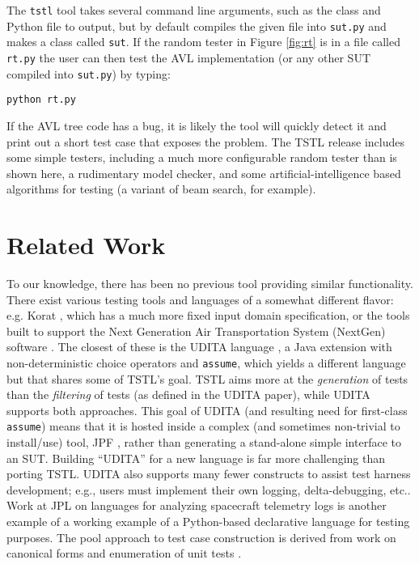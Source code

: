 \documentclass{sig-alternate}
\begin{document}
The {\tt tstl} tool takes several command line arguments, such as the
class and Python file to output, but by default compiles the given
file into {\tt sut.py} and makes a class called {\tt sut}.  If the
random tester in Figure \ref{fig:rt} is in a file called {\tt rt.py} the
user can then test the AVL implementation (or any other SUT compiled
into {\tt sut.py}) by typing:

\begin{verbatim}
python rt.py
\end{verbatim}

If the AVL tree code has a bug, it is likely the tool will quickly
detect it and print out a short test case that exposes the problem.
The TSTL release includes some simple testers, including a much more
configurable random tester than is shown here, a rudimentary model
checker, and some artificial-intelligence based algorithms for testing
(a variant of beam search, for example).

\section{Related Work}


To our knowledge, there has been no previous tool providing similar
functionality.  
There exist various testing tools and languages of a somewhat
different flavor: e.g. Korat \cite{Korat}, which has a much more fixed
input domain specification, or the tools built to support the Next
Generation Air Transportation System (NextGen) software
\cite{TameInputs}.  The closest of these is the UDITA language
\cite{UDITA}, a Java extension with non-deterministic choice
operators and {\tt assume}, which yields a different language but
that shares some of TSTL's goal.  TSTL aims more at the \emph{generation} of
tests than the \emph{filtering} of tests (as defined in the UDITA
paper), while UDITA supports both approaches.  This goal of UDITA (and
resulting need for first-class {\tt assume}) means that it is hosted
inside a complex (and sometimes non-trivial to install/use) tool, JPF
\cite{JPF2}, rather than generating a stand-alone simple interface to
an SUT.  Building ``UDITA'' for a new language is
far more challenging than porting TSTL.  UDITA also supports many fewer
constructs to assist test harness development; e.g., users must
implement their own logging, delta-debugging, etc..
Work at JPL on languages for analyzing spacecraft telemetry
logs\cite{scriptstospecs} is another example of a working example of a
Python-based declarative language for testing purposes.  The pool
approach to test case construction is derived from work on canonical
forms and enumeration of unit tests \cite{AndrewsTR}.
\end{document}
